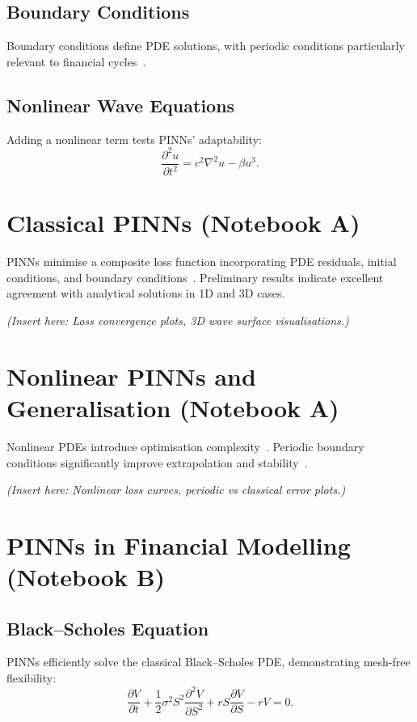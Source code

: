 \documentclass[12pt,a4paper]{article}
\begin{document}
\subsection{Boundary Conditions}

Boundary conditions define PDE solutions, with periodic conditions particularly relevant to financial cycles~\cite{zhu2022periodic}.

\subsection{Nonlinear Wave Equations}

Adding a nonlinear term tests PINNs' adaptability:
\[
\frac{\partial^2 u}{\partial t^2}=c^2\nabla^2 u-\beta u^3.
\]

\section{Classical PINNs (Notebook A)}

PINNs minimise a composite loss function incorporating PDE residuals, initial conditions, and boundary conditions~\cite{raissi2019physics,baydin2018automatic}. Preliminary results indicate excellent agreement with analytical solutions in 1D and 3D cases.

\textit{(Insert here: Loss convergence plots, 3D wave surface visualisations.)}

\section{Nonlinear PINNs and Generalisation (Notebook A)}

Nonlinear PDEs introduce optimisation complexity~\cite{wang2022understanding}. Periodic boundary conditions significantly improve extrapolation and stability~\cite{karniadakis2021physics}.

\textit{(Insert here: Nonlinear loss curves, periodic vs classical error plots.)}

\section{PINNs in Financial Modelling (Notebook B)}

\subsection{Black–Scholes Equation}

PINNs efficiently solve the classical Black–Scholes PDE, demonstrating mesh-free flexibility:
\[
\frac{\partial V}{\partial t}+\frac{1}{2}\sigma^2S^2\frac{\partial^2 V}{\partial S^2}+rS\frac{\partial V}{\partial S}-rV=0.
\]
\end{document}
